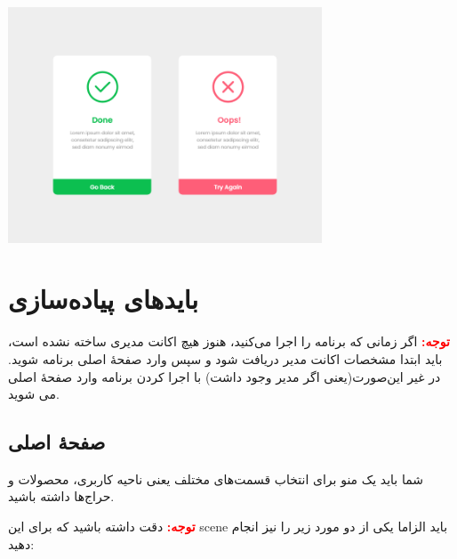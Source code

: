 \documentclass[]{article}
\begin{document}
\begin{itemize}
\begin{center}
\includegraphics[width=0.7\textwidth]{images/image5.png}
\end{center}

\end{itemize}



\newpage

\section*{{\titr باید‌های پیاده‌سازی}}

\textbf{\textcolor{red}{توجه:}}
اگر زمانی که برنامه را اجرا می‌کنید، هنوز هیچ اکانت مدیری ساخته نشده است، باید ابتدا مشخصات اکانت مدیر دریافت شود و سپس وارد صفحهٔ اصلی برنامه شوید. در غیر این‌صورت(یعنی اگر مدیر وجود داشت) با اجرا کردن برنامه وارد صفحهٔ اصلی می شوید.

\subsection*{{\titr صفحهٔ اصلی}}


شما باید یک منو برای انتخاب قسمت‌های مختلف یعنی ناحیه کاربری، محصولات و حراج‌ها داشته باشید.

\textbf{\textcolor{red}{توجه:}}
 دقت داشته باشید که برای این scene باید الزاما یکی از دو مورد زیر را نیز انجام دهید:
\end{document}
